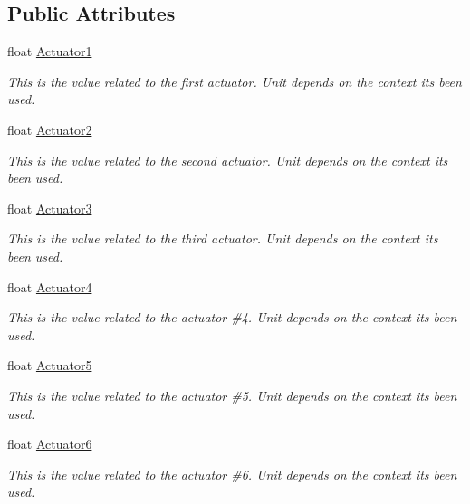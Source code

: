 \subsection*{Public Attributes}
\begin{DoxyCompactItemize}
\item 
float \hyperlink{struct_angular_info_a5fc555c085bddc82c33a3039fbc40932}{Actuator1}
\begin{DoxyCompactList}\small\item\em This is the value related to the first actuator. Unit depends on the context it\textquotesingle{}s been used. \end{DoxyCompactList}\item 
float \hyperlink{struct_angular_info_ab7b9349eef239f9741d9c28a795e4c35}{Actuator2}
\begin{DoxyCompactList}\small\item\em This is the value related to the second actuator. Unit depends on the context it\textquotesingle{}s been used. \end{DoxyCompactList}\item 
float \hyperlink{struct_angular_info_a30426eab94c82cfd3d697bbc8c506c2a}{Actuator3}
\begin{DoxyCompactList}\small\item\em This is the value related to the third actuator. Unit depends on the context it\textquotesingle{}s been used. \end{DoxyCompactList}\item 
float \hyperlink{struct_angular_info_a46a1314c4846de6a495310b44fe5e0c3}{Actuator4}
\begin{DoxyCompactList}\small\item\em This is the value related to the actuator \#4. Unit depends on the context it\textquotesingle{}s been used. \end{DoxyCompactList}\item 
float \hyperlink{struct_angular_info_a953c29d2481eb1c42c84e9c992d34dde}{Actuator5}
\begin{DoxyCompactList}\small\item\em This is the value related to the actuator \#5. Unit depends on the context it\textquotesingle{}s been used. \end{DoxyCompactList}\item 
float \hyperlink{struct_angular_info_ab54771129d8a9e451c27942dd349340d}{Actuator6}
\begin{DoxyCompactList}\small\item\em This is the value related to the actuator \#6. Unit depends on the context it\textquotesingle{}s been used. \end{DoxyCompactList}\end{DoxyCompactItemize}


